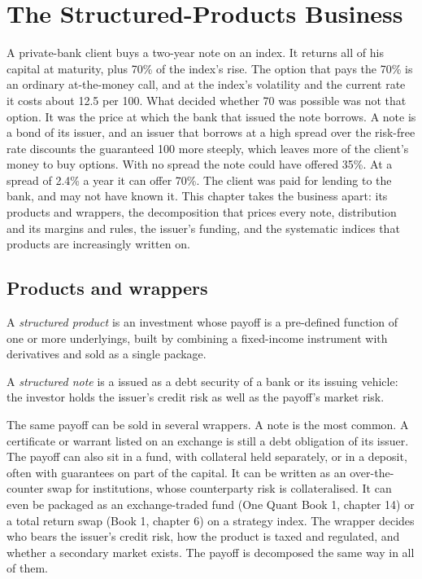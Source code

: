\chapter{The Structured-Products Business}\label{ch:dv:the-structured-products-business}

A private-bank client buys a two-year note on an index. It returns all of his capital at maturity, plus 70\% of the
index's rise. The option that pays the 70\% is an ordinary at-the-money call, and at the index's volatility and the
current rate it costs about 12.5 per 100. What decided whether 70 was possible was not that option. It was the price at
which the bank that issued the note borrows. A note is a bond of its issuer, and an issuer that borrows at a high spread
over the risk-free rate discounts the guaranteed 100 more steeply, which leaves more of the client's money to buy options.
With no spread the note could have offered 35\%. At a spread of 2.4\% a year it can offer 70\%. The client was paid for
lending to the bank, and may not have known it. This chapter takes the business apart: its products and wrappers, the
decomposition that prices every note, distribution and its margins and rules, the issuer's funding, and the systematic
indices that products are increasingly written on.

\section{Products and wrappers}

\begin{definition}\label{def:dv:the-structured-products-business:product}
A \emph{structured product} is an investment whose payoff is a pre-defined function of one or more
underlyings, built by combining a fixed-income instrument with derivatives and sold as a single package.
\end{definition}

\begin{definition}\label{def:dv:the-structured-products-business:note}
A \emph{structured note} is a  issued as a debt security of a bank or its issuing
vehicle: the investor holds the issuer's credit risk as well as the payoff's market risk.
\end{definition}

The same payoff can be sold in several wrappers. A note is the most common. A certificate or warrant listed on an exchange
is still a debt obligation of its issuer. The payoff can also sit in a fund, with collateral held separately, or in a
deposit, often with guarantees on part of the capital. It can be written as an over-the-counter swap for institutions, whose
counterparty risk is collateralised. It can even be packaged as an exchange-traded fund (One Quant Book 1, chapter 14) or a
total return swap (Book 1, chapter 6) on a strategy index. The wrapper decides who bears the issuer's credit risk, how the
product is taxed and regulated, and whether a secondary market exists. The payoff is decomposed the same way in all of them.

